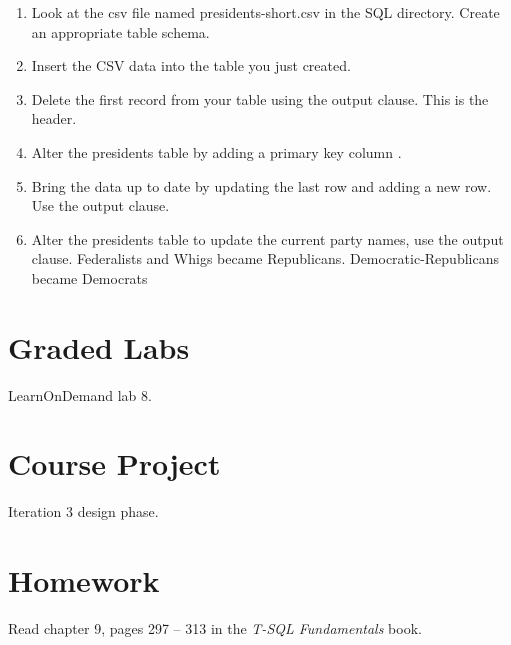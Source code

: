 \documentclass{article}
\begin{document}
    \begin{enumerate}
\item Look at the csv file named presidents-short.csv in the SQL directory. Create an appropriate table schema.

\item Insert the CSV data into the table you just created.

\item Delete the first record from your table using the output clause. This is the header.

\item Alter the presidents table by adding a primary key column .

\item Bring the data up to date by updating the last row and adding a new row. Use the output clause.

\item Alter the presidents table to update the current party names, use the output clause.  Federalists and Whigs became Republicans.  Democratic-Republicans became Democrats
    \end{enumerate}

    \section{Graded Labs}

    LearnOnDemand lab 8.

    \section{Course Project}

    Iteration 3 design phase.

    \section{Homework}

        Read chapter 9, pages 297  -- 313  in the \textit{T-SQL Fundamentals} book.
        
\end{document}
